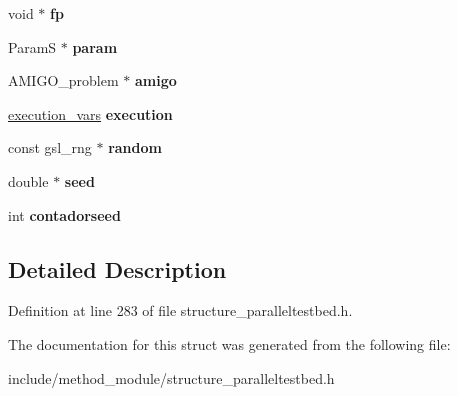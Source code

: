 \begin{DoxyCompactItemize}
\item 
\hypertarget{structexperiment__total_a25c3b6860add3ba03abc42dce912286a}{void $\ast$ {\bfseries fp}}\label{structexperiment__total_a25c3b6860add3ba03abc42dce912286a}

\item 
\hypertarget{structexperiment__total_a2c67dafdb7a6c1aab5dadabbe193e95f}{Param\-S $\ast$ {\bfseries param}}\label{structexperiment__total_a2c67dafdb7a6c1aab5dadabbe193e95f}

\item 
\hypertarget{structexperiment__total_a240d49bd5ada19e1ca178ab0db479879}{A\-M\-I\-G\-O\-\_\-problem $\ast$ {\bfseries amigo}}\label{structexperiment__total_a240d49bd5ada19e1ca178ab0db479879}

\item 
\hypertarget{structexperiment__total_a19d59c5a6d88f9aa10249e00cb211753}{\hyperlink{structexecution__vars}{execution\-\_\-vars} {\bfseries execution}}\label{structexperiment__total_a19d59c5a6d88f9aa10249e00cb211753}

\item 
\hypertarget{structexperiment__total_a4d83ad70a52bcd3196044ba62d105b04}{const gsl\-\_\-rng $\ast$ {\bfseries random}}\label{structexperiment__total_a4d83ad70a52bcd3196044ba62d105b04}

\item 
\hypertarget{structexperiment__total_a3a0272efb6b0f42827e0e16d7ad44b8d}{double $\ast$ {\bfseries seed}}\label{structexperiment__total_a3a0272efb6b0f42827e0e16d7ad44b8d}

\item 
\hypertarget{structexperiment__total_a82125702a2266fbd8740c0c75a0abc90}{int {\bfseries contadorseed}}\label{structexperiment__total_a82125702a2266fbd8740c0c75a0abc90}

\end{DoxyCompactItemize}


\subsection{Detailed Description}


Definition at line 283 of file structure\-\_\-paralleltestbed.\-h.



The documentation for this struct was generated from the following file\-:\begin{DoxyCompactItemize}
\item 
include/method\-\_\-module/structure\-\_\-paralleltestbed.\-h\end{DoxyCompactItemize}
